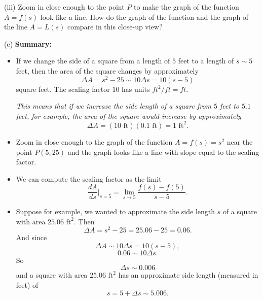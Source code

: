 \documentclass{ximera}
\begin{document}
\begin{question}
(iii) Zoom in close enough to the point $P$ to make the graph of the function $A=f(s)$ look like a line. How do the graph of the function and the graph of the line $A=L(s)$ compare in this close-up view?
\begin{freeResponse}
\end{freeResponse}

(e) {\bf Summary:}
\begin{itemize}
\item{If we change the side of a square from a length of $5$ feet to a length of $s\sim 5$ feet, then the area of the square changes by approximately
\[
 \Delta A = s^2-25  \sim 10 \Delta s = 10 (s-5)
\]
square feet. The scaling factor $10$ has units $ft^2/ft = ft$.
}

\emph{This means that if we increase the side length of a square from $5$ feet to $5.1$ feet, for example, the area of the square would increase by approximately}
\[
  \Delta A = \left( 10 \text{ ft} \right)(0.1 \text{ ft}) = 1 \text{ ft}^2.
\]

\item{Zoom in close enough to the graph of the function $A=f(s)=s^2$ near the point $P(5,25)$ and the graph looks like a line with slope equal to the scaling factor.}

\item{We can compute the scaling factor as the limit
\[
    \frac{dA}{ds}\Big|_{s=5} = \lim_{s\to 5} \frac{f(s)-f(5)}{s-5} . 
\]
}

\item{Suppose for example, we wanted to approximate the side length $s$ of a square with area $25.06\text{ ft}^2$. Then 
\[ 
         \Delta A = s^2 - 25 = 25.06 - 25 = 0.06 .
\]
And since
\[
   \Delta A \sim 10 \Delta s = 10(s-5), 
\]
\[
          0.06 \sim 10\Delta s .
\]
So
\[
  \Delta s \sim 0.006
\]
and a square with area $25.06 \text{ ft}^2$ has an approximate side length (measured in feet) of
\[
    s = 5 + \Delta s \sim 5.006.
\]
}

\end{itemize}



\end{question}
\end{document}
